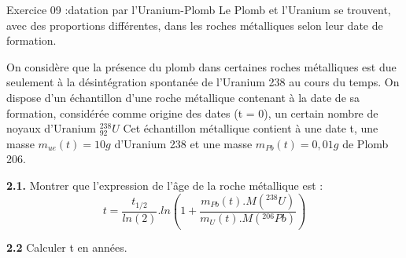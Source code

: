 \documentclass[12pt, french]{article}
\begin{document}
\begin{Box2}{Exercice 09 :datation par l’Uranium-Plomb}
Le Plomb et l’Uranium se trouvent, avec des proportions différentes, dans les roches métalliques selon
leur date de formation.

On considère que la présence du plomb dans certaines roches métalliques est due seulement à la
désintégration spontanée de l’Uranium 238 au cours du temps. On dispose d’un échantillon d’une
roche métallique contenant à la date de sa formation, considérée comme origine des dates (t = 0), un
certain nombre de noyaux d’Uranium $^{238}_{92}U$ Cet échantillon métallique contient à une date t, une
masse $m_{ue}(t)=10g$ d’Uranium 238 et une masse $m_{Pb}(t) = 0,01 g$ de Plomb 206.

\textbf{2.1. } Montrer que l’expression de l’âge de la roche métallique est : 
$$t = \frac{t_{1/2}}{ln(2)}.ln(1+\frac{m_{Pb}(t) . M(^{238}U)}{m_U(t).M(^{206}Pb)})$$

\textbf{2.2 }Calculer t en années. 
\end{Box2}


\end{document}
